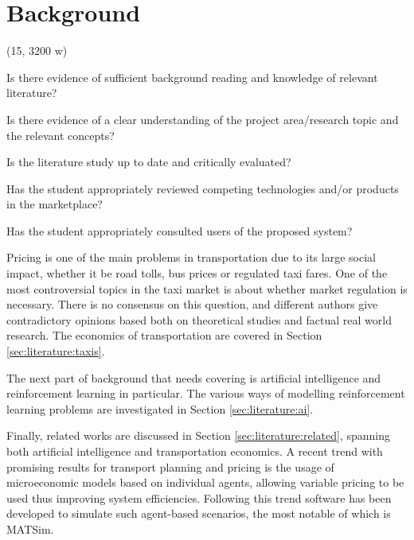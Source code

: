\newpage
\section{Background}
\label{sec:literature}

(15, 3200 w)

Is there evidence of sufficient background reading and knowledge of relevant
literature?

Is there evidence of a clear understanding of the project area/research topic
and the relevant concepts?

Is the literature study up to date and critically evaluated?

Has the student appropriately reviewed competing technologies and/or products
in the marketplace?

Has the student appropriately consulted users of the proposed system?


Pricing is one of the main problems in transportation due to its large social
impact, whether it be road tolls, bus prices or regulated taxi fares. One of
the most controversial topics in the taxi market is about whether market
regulation is necessary. There is no consensus on this question, and different
authors give contradictory opinions based both on theoretical studies and
factual real world research. The economics of transportation are covered in
Section \ref{sec:literature:taxis}.

The next part of background that needs covering is artificial intelligence and
reinforcement learning in particular. The various ways of modelling
reinforcement learning problems are investigated in Section
\ref{sec:literature:ai}.

Finally, related works are discussed in Section \ref{sec:literature:related},
spanning both artificial intelligence and transportation economics. A recent
trend with promising results for transport planning and pricing is the usage of
microeconomic models based on individual agents, allowing variable pricing to
be used thus improving system efficiencies. Following this trend software has
been developed to simulate such agent-based scenarios, the most notable of
which is MATSim.

